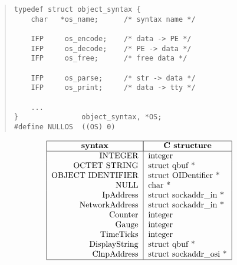 \begin{bwslide}

\begin{quote}\small\begin{verbatim}
typedef struct object_syntax {
    char   *os_name;      /* syntax name */

    IFP     os_encode;    /* data -> PE */
    IFP     os_decode;    /* PE -> data */
    IFP     os_free;      /* free data */

    IFP     os_parse;     /* str -> data */
    IFP     os_print;     /* data -> tty */

    ...
}               object_syntax, *OS;
#define NULLOS  ((OS) 0)
\end{verbatim}\end{quote}
\end{bwslide}


\begin{bwslide}

\[\tt\begin{tabular}{|r|l|}
\hline
\multicolumn{1}{|c|}{\bf syntax}&
		\multicolumn{1}{|c|}{\bf C structure}\\
\hline
INTEGER&    		integer\\
OCTET STRING&		struct qbuf *\\
OBJECT IDENTIFIER&	struct OIDentifier *\\
NULL&			char *\\
IpAddress&		struct sockaddr\_in *\\
NetworkAddress&		struct sockaddr\_in *\\
Counter&		integer\\
Gauge&			integer\\
TimeTicks&		integer\\
DisplayString&		struct qbuf *\\
ClnpAddress&		struct sockaddr\_osi *\\
\hline
\end{tabular}\]
\end{bwslide}




